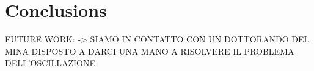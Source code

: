 \chapter{Conclusions}\label{sec:conclusions}
FUTURE WORK: -> SIAMO IN CONTATTO CON UN DOTTORANDO DEL MINA DISPOSTO A DARCI UNA MANO A RISOLVERE IL PROBLEMA DELL'OSCILLAZIONE